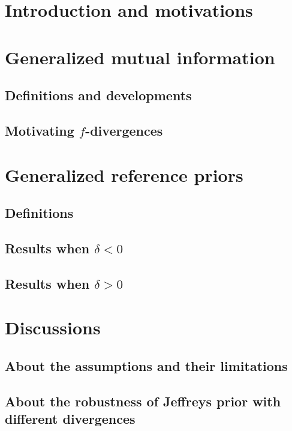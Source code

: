 
\section{Introduction and motivations}


\section{Generalized mutual information}

\subsection{Definitions and developments}

\subsection{Motivating $f$-divergences}


\section{Generalized reference priors}

\subsection{Definitions}

\subsection{Results when $\delta<0$}

\subsection{Results when $\delta>0$}


\section{Discussions}

    \subsection{About the assumptions and their limitations}


    \subsection{About the robustness of Jeffreys prior with different divergences}


